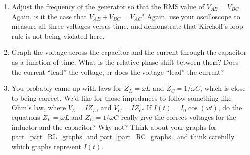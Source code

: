 \begin{enumerate}[wide]
\item Adjust the frequency of the generator so that the RMS value of $V_{AB} = V_{BC}$.   Again, is it the case that $V_{AB} + V_{BC} = V_{AC}$?  Again, use your oscilloscope to measure all three voltages versus time, and demonstrate that Kirchoff's loop rule is not being violated here.  

\item Graph the voltage across the capacitor and the current through the capacitor as a function of time.  What is the relative phase shift between them?  Does the current ``lead'' the voltage, or does the voltage ``lead'' the current? \label{part_RC_graphs}

\vfill

\item You probably came up with laws for $Z_L = \omega L$ and $Z_C = 1/ \omega C$, which is close to being correct.  We'd like for those impedances to follow something like Ohm's law, where $V_L = I Z_L$, and $V_C = I Z_C$.  If  $I(t) = I_0 \cos(\omega t)$, do the equations $Z_L = \omega L$ and $Z_C = 1/ \omega C$ really give the correct voltages for the inductor and the capacitor?  Why not?  Think about your graphs for part~\ref{part_RL_graphs} and part~\ref{part_RC_graphs}, and think carefully which graphs represent $I(t)$.

\end{enumerate}





